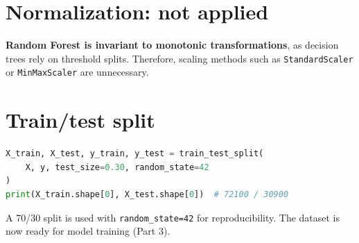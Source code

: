 \section{Normalization: not applied}

\textbf{Random Forest is invariant to monotonic transformations}, as decision trees rely on threshold splits. Therefore, scaling methods such as \texttt{StandardScaler} or \texttt{MinMaxScaler} are unnecessary.

\section{Train/test split}

\begin{lstlisting}[language=Python]
X_train, X_test, y_train, y_test = train_test_split(
    X, y, test_size=0.30, random_state=42
)
print(X_train.shape[0], X_test.shape[0])  # 72100 / 30900
\end{lstlisting}

A 70/30 split is used with \texttt{random\_state=42} for reproducibility. The dataset is now ready for model training (Part 3).